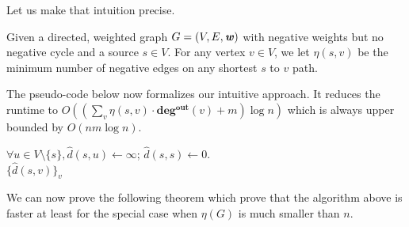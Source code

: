 Let us make that intuition precise.

\begin{definition}
Given a directed, weighted graph $G=(V,E,\boldsymbol{\mathit{w}})$ with negative weights but no negative cycle and a source $s \in V$. For any vertex $v \in V$, we let $\eta(s,v)$ be the minimum number of negative edges on any shortest $s$ to $v$ path. 
\end{definition}

The pseudo-code below now formalizes our intuitive approach. It reduces the runtime to $O((\sum_v \eta(s,v) \cdot \mathbf{deg^{out}}(v) + m) \log n)$ which is always upper bounded by $O(nm \log n)$.

\begin{algorithm}
$\forall u \in V \setminus \{s\}, \hat{d}(s, u) \gets \infty$; $\hat{d}(s,s) \gets 0$.\\
\Return $\{\hat{d}(s, v) \}_v$
\caption{$\textsc{HeuristicBellmanFord}(G,s)$}
\label{alg:embellishedBellmanFord}
\end{algorithm}

We can now prove the following theorem which prove that the algorithm above is faster at least for the special case when $\eta(G)$ is much smaller than $n$.

